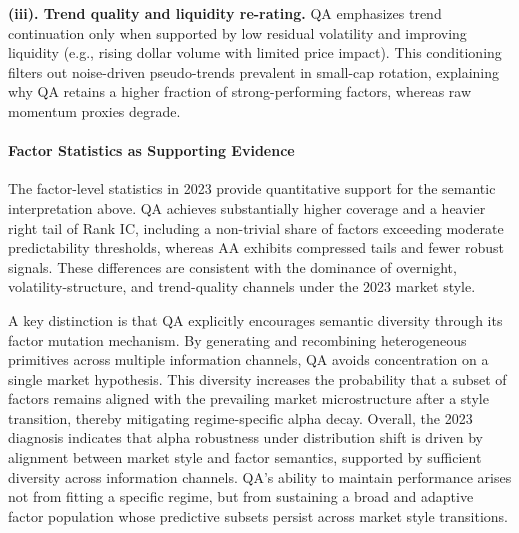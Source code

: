 \textbf{(iii). Trend quality and liquidity re-rating.}
QA emphasizes trend continuation only when supported by low residual volatility and improving liquidity (e.g., rising dollar volume with limited price impact).  
This conditioning filters out noise-driven pseudo-trends prevalent in small-cap rotation, explaining why QA retains a higher fraction of strong-performing factors, whereas raw momentum proxies degrade.

\paragraph{Factor Statistics as Supporting Evidence} The factor-level statistics in 2023 provide quantitative support for the semantic interpretation above.  
QA achieves substantially higher coverage and a heavier right tail of Rank IC, including a non-trivial share of factors exceeding moderate predictability thresholds, whereas AA exhibits compressed tails and fewer robust signals.  
These differences are consistent with the dominance of overnight, volatility-structure, and trend-quality channels under the 2023 market style.

A key distinction is that QA explicitly encourages semantic diversity through its factor mutation mechanism.  
By generating and recombining heterogeneous primitives across multiple information channels, QA avoids concentration on a single market hypothesis.  
This diversity increases the probability that a subset of factors remains aligned with the prevailing market microstructure after a style transition, thereby mitigating regime-specific alpha decay.
Overall, the 2023 diagnosis indicates that alpha robustness under distribution shift is driven by alignment between market style and factor semantics, supported by sufficient diversity across information channels.  
QA’s ability to maintain performance arises not from fitting a specific regime, but from sustaining a broad and adaptive factor population whose predictive subsets persist across market style transitions.



